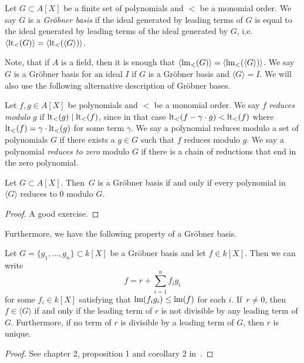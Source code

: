 \begin{definition}
  Let $G \subset A[X]$ be a finite set of polynomials and $<$ be a monomial order. We say $G$ is a \textit{Gröbner basis} if the ideal generated by leading terms of $G$ is equal to the ideal generated by leading terms of the ideal generated by $G$, i.e.
  $\langle \operatorname{lt}_{<}(G) \rangle = \langle \operatorname{lt}_{<}(\langle G \rangle) \rangle$.
\end{definition}

Note, that if $A$ is a field, then it is enough that $\langle \operatorname{lm}_{<}(G) \rangle = \langle \operatorname{lm}_{<}(\langle G \rangle) \rangle$. We say $G$ is a Gröbner basis for an ideal $I$ if $G$ is a Gröbner basis and $\langle G \rangle = I$. We will also use the following alternative description of Gröbner bases.

\begin{definition}
  Let $f, g \in A[X]$ be polynomials and $<$ be a monomial order. We say $f$ \textit{reduces modulo} $g$ if $\operatorname{lt}_{<}(g) \mid \operatorname{lt}_{<}(f)$, since in that case $\operatorname{lt}_{<}(f - \gamma\cdot g) < \operatorname{lt}_{<}(f)$ where $\operatorname{lt}_{<}(f) = \gamma \cdot \operatorname{lt}_{<}(g)$ for some term $\gamma$. We say a polynomial reduces modulo a set of polynomials $G$ if there exists a $g \in G$ such that $f$ reduces modulo $g$. We say a polynomial \textit{reduces to zero} modulo $G$ if there is a chain of reductions that end in the zero polynomial.
\end{definition}

\begin{theorem}\label{thm:grb}
  Let $G \subset A[X]$. Then $\,G$ is a Gröbner basis if and only if every polynomial in $\langle G \rangle$ reduces to 0 modulo $G$.
\end{theorem}
\begin{proof}
  A good exercise.
\end{proof}

Furthermore, we have the following property of a Gröbner basis.

\begin{theorem}
  Let $G = \{g_{1}, \dots, g_{n}\} \subset k[X]$ be a Gröbner basis and let $f \in k[X]$. Then we can write
  \[f = r + \sum_{i=1}^{n} f_{i}g_{i}\]
  for some $f_{i} \in k[X]$ satisfying that $\operatorname{lm}(f_{i} g_{i}) \leq \operatorname{lm}(f)$ for each $i$. If $\,r \neq 0$, then $f \in \langle G \rangle$ if and only if the leading term of $r$ is not divisible by any leading term of $G$. Furthermore, if no term of $r$ is divisible by a leading term of $G$, then $r$ is unique.
\end{theorem}
\begin{proof}
  See chapter 2, proposition 1 and corollary 2 in~\cite{IVA}.
\end{proof}



